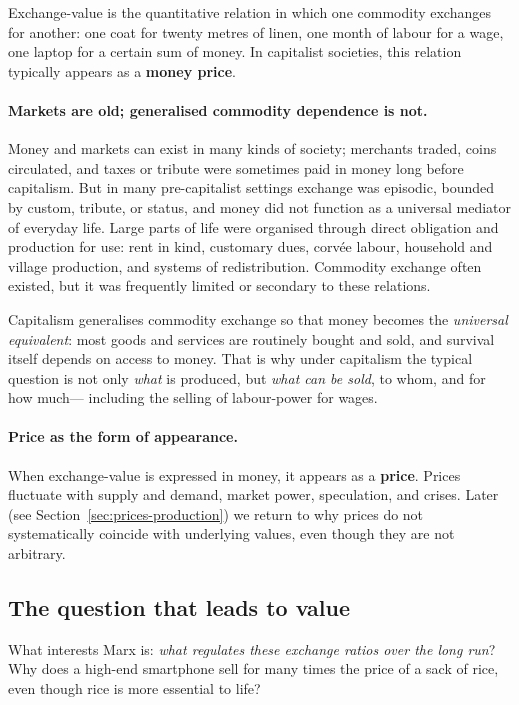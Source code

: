 Exchange-value is the quantitative relation in which one commodity exchanges for another: one coat for twenty
metres of linen, one month of labour for a wage, one laptop for a certain sum of money. In capitalist societies,
this relation typically appears as a \textbf{money price}.

\paragraph{Markets are old; generalised commodity dependence is not.}
Money and markets can exist in many kinds of society; merchants traded, coins circulated, and taxes or tribute
were sometimes paid in money long before capitalism. But in many pre-capitalist settings exchange was episodic,
bounded by custom, tribute, or status, and money did not function as a universal mediator of everyday life.
Large parts of life were organised through direct obligation and production for use: rent in kind, customary dues,
corv\'ee labour, household and village production, and systems of redistribution. Commodity exchange often existed,
but it was frequently limited or secondary to these relations.

Capitalism generalises commodity exchange so that money becomes the \emph{universal equivalent}: most goods and
services are routinely bought and sold, and survival itself depends on access to money. That is why under capitalism
the typical question is not only \emph{what} is produced, but \emph{what can be sold}, to whom, and for how much---
including the selling of labour-power for wages.

\paragraph{Price as the form of appearance.}
When exchange-value is expressed in money, it appears as a \textbf{price}. Prices fluctuate with supply and demand,
market power, speculation, and crises. Later (see Section~\ref{sec:prices-production}) we return to why prices do not
systematically coincide with underlying values, even though they are not arbitrary.

\subsection{The question that leads to value}
\label{sec:question-leads-to-value}

What interests Marx is: \emph{what regulates these exchange ratios over the long run}? Why does a high-end smartphone
sell for many times the price of a sack of rice, even though rice is more essential to life?

